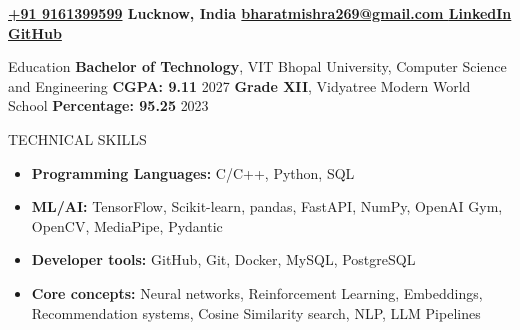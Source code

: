 \documentclass{resume}
\begin{document}
\begin{center}
\textbf{\large{\href{tel:+91 9161399599}{+91 9161399599} \textbar{} Lucknow, India \textbar{} {\href{mailto:bharatmishra269@gmail.com}{bharatmishra269@gmail.com \textbar{} \href{https://www.linkedin.com/in/bharat-mishra-50090a249/}{LinkedIn} \textbar{} GitHub}}}}
\end{center}
\begin{rSection}{Education}
\textbf{Bachelor of Technology}, VIT Bhopal University, Computer Science and Engineering  \textbf{CGPA: 9.11} \hfill  2027 \newline
\textbf{Grade XII}, Vidyatree Modern World School {\textbf{Percentage: 95.25} }\hfill 2023 \end{rSection} 
\begin{rSection}{TECHNICAL SKILLS}
\begin{itemize}
    \item \textbf{Programming Languages:} C/C++, Python, SQL
    \item \textbf{ML/AI:} TensorFlow, Scikit-learn, pandas, FastAPI, NumPy, OpenAI Gym, OpenCV, MediaPipe, Pydantic
    \item {\textbf{Developer tools:}} GitHub, Git, Docker, MySQL, PostgreSQL
    \item \textbf{Core concepts:} Neural networks, Reinforcement Learning, Embeddings, Recommendation systems, Cosine Similarity search, NLP,  LLM Pipelines
\end{itemize}
\end{rSection}
\end{document}
